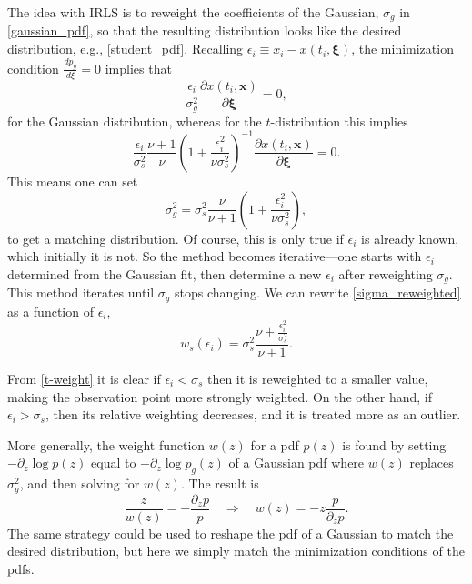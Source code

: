 \documentclass{ametsoc}
\begin{document}
The idea with IRLS is to reweight the coefficients of the Gaussian, $\sigma_g$ in \eqref{gaussian_pdf}, so that the resulting distribution looks like the desired distribution, e.g., \eqref{student_pdf}. Recalling $\epsilon_i \equiv x_i - x(t_i,\mathbf{\xi})$, the minimization condition $\frac{d p_g}{d\xi}=0$ implies that
\begin{equation}
\frac{\epsilon_i}{\sigma_g^2} \frac{\partial x(t_i,\mathbf{x})}{\partial \mathbf{\xi}} = 0,
\end{equation}
for the Gaussian distribution, whereas for the $t$-distribution this implies
\begin{equation}
 \frac{\epsilon_i}{\sigma_s^2} \frac{\nu+1}{\nu} \left( 1 + \frac{\epsilon_i^2}{\nu \sigma_s^2} \right)^{-1}  \frac{\partial x(t_i,\mathbf{x})}{\partial \mathbf{\xi}}  = 0.
\end{equation}
This means one can set
\begin{equation}
\sigma_g^2 =   \sigma_s^2 \frac{\nu}{\nu+1} \left( 1 + \frac{\epsilon_i^2}{\nu \sigma_s^2} \right),
\label{sigma_reweighted}
\end{equation}
to get a matching distribution. Of course, this is only true if $\epsilon_i$ is already known, which initially it is not. So the method becomes iterative---one starts with $\epsilon_i$ determined from the Gaussian fit, then determine a new $\epsilon_i$ after reweighting $\sigma_g$. This method iterates until $\sigma_g$ stops changing. We can rewrite \eqref{sigma_reweighted} as a function of $\epsilon_i$,
\begin{equation}
\label{t-weight}
w_s(\epsilon_i) = \sigma_s^2 \frac{\nu  + \frac{\epsilon_i^2}{\sigma_s^2}}{\nu+1}.
\end{equation}

From \eqref{t-weight} it is clear if $\epsilon_i < \sigma_s$ then it is reweighted to a smaller value, making the observation point more strongly weighted. On the other hand, if $\epsilon_i > \sigma_s$, then its relative weighting decreases, and it is treated more as an outlier.

More generally, the weight function $w(z)$ for a pdf $p(z)$ is found by setting $-\partial_z \log p(z)$ equal to $-\partial_z \log p_g(z)$ of a Gaussian pdf where $w(z)$ replaces $\sigma_g^2$,
and then solving for $w(z)$. The result is
\begin{equation}
    \frac{z}{w(z)} = - \frac{\partial_z p}{p}
\quad \Rightarrow \quad
    w(z) = -z \frac{p}{\partial_z p}.
\end{equation}
The same strategy could be used to reshape the pdf of a Gaussian to match the desired distribution, but here we simply match the minimization conditions of the pdfs.
\end{document}
